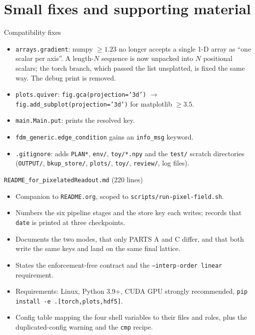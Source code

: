 \documentclass[10pt,aspectratio=169]{beamer}
\newcommand{\ti}[1]{\texttt{\footnotesize #1}}
\begin{document}
\section{Small fixes and supporting material}

\begin{frame}{Compatibility fixes}
  \begin{itemize}\small
  \item \ti{arrays.gradient}: numpy $\ge1.23$ no longer accepts a single 1-D array as
        ``one scalar per axis''. A length-$N$ sequence is now unpacked into $N$ positional
        scalars; the torch branch, which passed the list unsplatted, is fixed the same way.
        The debug print is removed.
  \item \ti{plots.quiver}: \ti{fig.gca(projection='3d')} $\rightarrow$
        \ti{fig.add\_subplot(projection='3d')} for matplotlib $\ge3.5$.
  \item \ti{main.Main.put}: prints the resolved key.
  \item \ti{fdm\_generic.edge\_condition} gains an \ti{info\_msg} keyword.
  \item \ti{.gitignore}: adds \ti{*PLAN*}, \ti{env/}, \ti{toy/*.npy} and the
        \ti{test/} scratch directories (\ti{OUTPUT/}, \ti{bkup\_store/}, \ti{plots/},
        \ti{toy/}, \ti{review/}, log files).
  \end{itemize}
\end{frame}

\begin{frame}{\texttt{README\_for\_pixelatedReadout.md} (220 lines)}
  \begin{itemize}\small
  \item Companion to \ti{README.org}, scoped to \ti{scripts/run-pixel-field.sh}.
  \item Numbers the six pipeline stages and the store key each writes; records that
        \ti{date} is printed at three checkpoints.
  \item Documents the two modes, that only PARTS A and C differ, and that both write the
        same keys and land on the same final lattice.
  \item States the enforcement-free contract and the \ti{--interp-order linear}
        requirement.
  \item Requirements: Linux, Python 3.9+, CUDA GPU strongly recommended,
        \ti{pip install -e .[torch,plots,hdf5]}.
  \item Config table mapping the four shell variables to their files and roles, plus the
        duplicated-config warning and the \ti{cmp} recipe.
  \end{itemize}
\end{frame}
\end{document}
